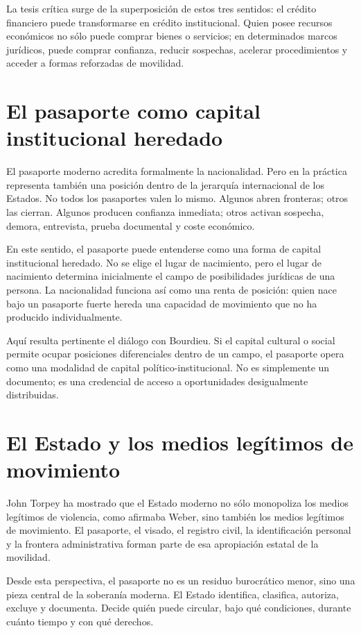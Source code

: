 \documentclass[12pt,a4paper]{article}
\begin{document}
La tesis crítica surge de la superposición de estos tres sentidos: el crédito financiero puede transformarse en crédito institucional. Quien posee recursos económicos no sólo puede comprar bienes o servicios; en determinados marcos jurídicos, puede comprar confianza, reducir sospechas, acelerar procedimientos y acceder a formas reforzadas de movilidad.

\section*{El pasaporte como capital institucional heredado}

El pasaporte moderno acredita formalmente la nacionalidad. Pero en la práctica representa también una posición dentro de la jerarquía internacional de los Estados. No todos los pasaportes valen lo mismo. Algunos abren fronteras; otros las cierran. Algunos producen confianza inmediata; otros activan sospecha, demora, entrevista, prueba documental y coste económico.

En este sentido, el pasaporte puede entenderse como una forma de capital institucional heredado. No se elige el lugar de nacimiento, pero el lugar de nacimiento determina inicialmente el campo de posibilidades jurídicas de una persona. La nacionalidad funciona así como una renta de posición: quien nace bajo un pasaporte fuerte hereda una capacidad de movimiento que no ha producido individualmente.

Aquí resulta pertinente el diálogo con Bourdieu. Si el capital cultural o social permite ocupar posiciones diferenciales dentro de un campo, el pasaporte opera como una modalidad de capital político-institucional. No es simplemente un documento; es una credencial de acceso a oportunidades desigualmente distribuidas.

\section*{El Estado y los medios legítimos de movimiento}

John Torpey ha mostrado que el Estado moderno no sólo monopoliza los medios legítimos de violencia, como afirmaba Weber, sino también los medios legítimos de movimiento. El pasaporte, el visado, el registro civil, la identificación personal y la frontera administrativa forman parte de esa apropiación estatal de la movilidad.

Desde esta perspectiva, el pasaporte no es un residuo burocrático menor, sino una pieza central de la soberanía moderna. El Estado identifica, clasifica, autoriza, excluye y documenta. Decide quién puede circular, bajo qué condiciones, durante cuánto tiempo y con qué derechos.
\end{document}
